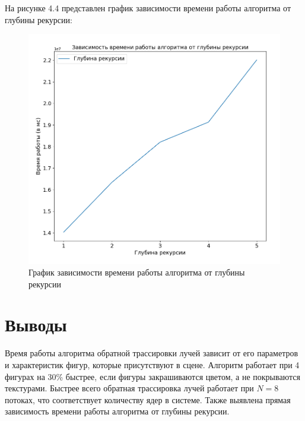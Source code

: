 На рисунке 4.4 представлен график зависимости времени работы алгоритма от глубины рекурсии:
\FloatBarrier
\begin{figure}[h]
	\begin{center}
		\includegraphics[width=\linewidth]{inc/recursion.png}
	\end{center}
	\caption{График зависимости времени работы алгоритма от глубины рекурсии}
\end{figure}
\FloatBarrier

\section{Выводы}
Время работы алгоритма обратной трассировки лучей зависит от его параметров и характеристик фигур, которые присутствуют в сцене.
Алгоритм работает при 4 фигурах на 30\% быстрее, если фигуры закрашиваются цветом, а не покрываются текстурами.
Быстрее всего обратная трассировка лучей работает при $N = 8$ потоках, что соответствует количеству ядер в системе.
Также выявлена прямая зависимость времени работы алгоритма от глубины рекурсии.